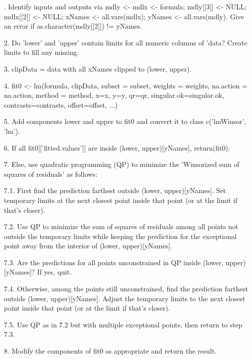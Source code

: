 \documentclass{article}
\begin{document}
\begin{Details}.  Identify inputs and outputs via mdly <- mdlx <- formula;
mdly[[3]] <- NULL;  mdlx[[2]] <- NULL;  xNames <- all.vars(mdlx); 
yNames <- all.vars(mdly).  Give an error if as.character(mdly[[2]]) !=
yNames.  

2.  Do 'lower' and 'upper' contain limits for all numeric columns of
'data?  Create limits to fill any missing.   

3.  clipData = data with all xNames clipped to (lower, upper).

4.  fit0 <- lm(formula, clipData, subset = subset, weights = weights,
na.action = na.action, method = method, x=x, y=y, qr=qr,
singular.ok=singular.ok, contrasts=contrasts, offset=offset, ...)

5.  Add components lower and upper to fit0 and convert it to class
c('lmWinsor', 'lm').  

6.  If all fit0[['fitted.values']] are inside (lower, upper)[yNames], 
return(fit0).

7.  Else, use quadratic programming (QP) to minimize the 'Winsorized
sum of squares of residuals' as follows:

7.1.  First find the prediction farthest outside (lower,
upper)[yNames].  Set temporary limits at the next closest point inside
that point (or at the limit if that's closer).  

7.2.  Use QP to minimize the sum of squares of residuals among all
points not outside the temporary limits while keeping the prediction
for the exceptional point away from the interior of (lower,
upper)[yNames].

7.3.  Are the predictions for all points unconstrained in QP inside
(lower, upper)[yNames]?  If yes, quit.    

7.4.  Otherwise, among the points still unconstrained, find the
prediction farthest outside (lower, upper)[yNames].  Adjust the
temporary limits to the next closest point inside that point (or at
the limit if that's closer).

7.5.  Use QP as in 7.2 but with multiple exceptional points, then
return to step 7.3.  

8.  Modify the components of fit0 as appropriate and return the
result.
\end{Details}
\end{document}
